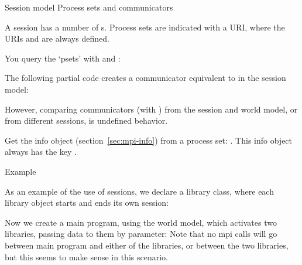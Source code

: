 \begin{mpifournote}{Session model}
 {Process sets and communicators}

A session has a number of s.
Process sets are indicated with a \acf{URI},
where the \acp{URI}  and 
are always defined.

You query the `psets' with 
and :
%

The following partial code creates a communicator equivalent to 
in the session model:
%

However, comparing communicators (with )
from the session and world model,
or from different sessions,
is undefined behavior.

\begin{comment}
  The resulting communicator compares as \indexmpishow{MPI_CONGRUENT}
  under \indexmpishow{MPI_Comm_compare}:
  \csnippetwithoutput{sessionmix}{examples/mpi/c}{sessionmix}
\end{comment}

Get the info object (section~\ref{sec:mpi-info}) from a process set:
.
This info object always has the key .

 {Example}

As an example of the use of sessions, we declare a library class,
where each library object starts and ends its own session:
%

Now we create a main program, using the world model,
which activates two libraries,
passing data to them by parameter:
%
%
Note that no mpi calls will go between main program and either
of the libraries,
or between the two libraries,
but this seems to make sense in this scenario.

\begin{comment}
7.2.4 When using the Sessions Model (Section 11.3) for initialization of MPI
re- sources, MPI_COMM_WORLD and MPI_COMM_SELF are not valid for use as
a communica- tor.

11.3 MPI objects derived from the Sessions Model shall not be
intermixed in a single MPI procedure call with MPI objects derived
from the World Model.

Are those two at odds? The first one seems to imply that in the second
statement objects from the world model can't even exist.
\end{comment}

\end{mpifournote}

